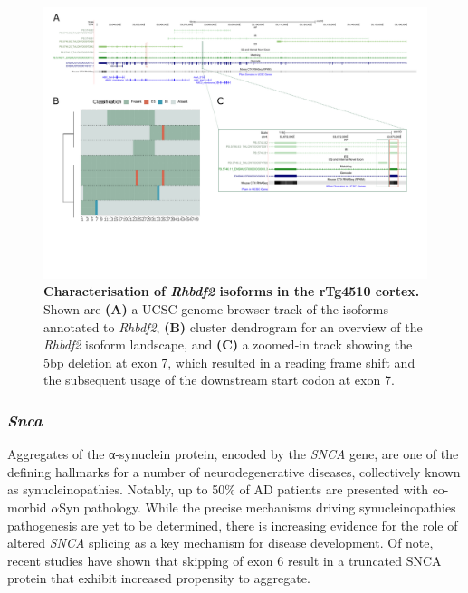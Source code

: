 \begin{landscape}
	\begin{figure}[htp]
		\centering
		\includegraphics[page=9,trim={0 5cm 0 0},scale = 0.85]{Figures/TargetGenes_Annotation_Landscape.pdf}
		\captionsetup{width=1.3\textwidth}
		\caption[Characterisation of the \textit{Rbhdf2} isoform landscape]%
		{\textbf{Characterisation of \textit{Rhbdf2} isoforms in the rTg4510 cortex.} Shown are \textbf{(A)} a UCSC genome browser track of the isoforms annotated to \textit{Rhbdf2}, \textbf{(B)} cluster dendrogram for an overview of the \textit{Rhbdf2} isoform landscape, and \textbf{(C)} a zoomed-in track showing the 5bp deletion at exon 7, which resulted in a reading frame shift and the subsequent usage of the downstream start codon at exon 7.}   
		\label{fig:rhbdf2}
	\end{figure}
\end{landscape}
\restoregeometry

\newpage
\subsubsection{\textit{Snca}}
Aggregates of the α-synuclein protein, encoded by the \textit{SNCA} gene, are one of the defining hallmarks for a number of neurodegenerative diseases, collectively known as synucleinopathies. Notably, up to 50\% of AD patients are presented with co-morbid $\alpha$Syn pathology\cite{Yoshino2016}. While the precise mechanisms driving synucleinopathies pathogenesis are yet to be determined, there is increasing evidence for the role of altered \textit{SNCA} splicing as a key mechanism for disease development\cite{Beyer2012, Beyer2006}. Of note, recent studies have shown that skipping of exon 6 result in a truncated SNCA protein that exhibit increased propensity to aggregate\cite{Beyer2012, Beyer2006}. 

